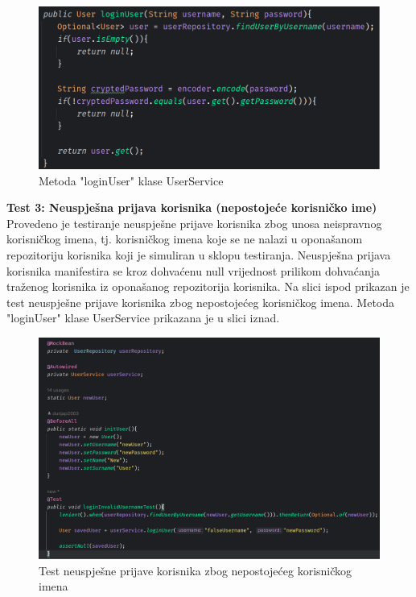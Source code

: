 						\begin{figure}[H]
			\includegraphics[scale=0.4]{slike/loginUser.PNG} %
			\centering
			\caption{Metoda "loginUser" klase UserService}
			\label{Metoda "loginUser" klase UserService}
		\end{figure}
		
\textbf{Test 3: Neuspješna prijava korisnika (nepostojeće korisničko ime)} \\
Provedeno je testiranje neuspješne prijave korisnika zbog unosa neispravnog korisničkog imena, tj. korisničkog imena koje se ne nalazi u oponašanom repozitoriju korisnika koji je simuliran u sklopu testiranja. Neuspješna prijava korisnika manifestira se kroz dohvaćenu null vrijednost prilikom dohvaćanja traženog korisnika iz oponašanog repozitorija korisnika. Na slici ispod prikazan je test neuspješne prijave korisnika zbog nepostojećeg korisničkog imena. Metoda "loginUser" klase UserService prikazana je u slici iznad.

				\begin{figure}[H]
			\includegraphics[scale=0.4]{slike/loginInvalidUsernameTest.PNG} %
			\centering
			\caption{Test neuspješne prijave korisnika zbog nepostojećeg korisničkog imena}
			\label{Test neuspješne prijave korisnika zbog nepostojećeg korisničkog imena}
		\end{figure}
		
